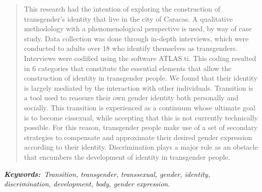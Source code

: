 \begin{quote}
\small
This research had the intention of exploring the construction of
transgender's identity that live in the city of Caracas. A qualitative
methodology with a phenomenological perspective is used, by way of case
study. Data collection was done through in-depth interviews, which were
conducted to adults over 18 who identify themselves as
transgenders. Interviews were codified using the software ATLAS.ti\@. This
coding resulted in 6 categories that constitute the essential elements that
allow the construction of identity in transgender people. We found that their
identity is largely mediated by the interaction with other individuals.
Transition is a tool used to reassure their own gender identity both
personally and socially. This transition is experienced as a continuum whose
ultimate goal is to become cissexual, while accepting that this is not
currently technically possible. For this reason, transgender people make use
of a set of secondary strategies to compensate and approximate their desired
gender expression according to their identity. Discrimination plays a major
role as an obstacle that encumbers the development of identity in transgender
people.
\end{quote}

\itshape\textbf{Keywords:}\normalfont{}\ Transition, transgender, transsexual,
gender, identity, discrimination, development, body, gender expression.
